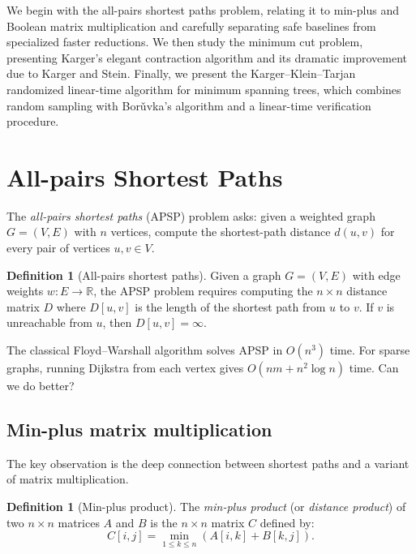 \documentclass[twoside,12pt]{book}
\theoremstyle{plain}
\theoremstyle{definition}
\newtheorem{definition}[theorem]{Definition}
\theoremstyle{remark}
\begin{document}
We begin with the all-pairs shortest paths problem, relating it to min-plus
and Boolean matrix multiplication and carefully separating safe baselines from
specialized faster reductions. We then study the minimum cut problem,
presenting Karger's elegant contraction algorithm and its dramatic improvement
due to Karger and Stein. Finally, we present the Karger--Klein--Tarjan
randomized linear-time algorithm for minimum spanning trees, which combines
random sampling with Bor\v{u}vka's algorithm and a linear-time verification
procedure.

\section{All-pairs Shortest Paths}
\label{sec:apsp}

The \emph{all-pairs shortest paths} (APSP) problem asks: given a weighted graph $G = (V, E)$ with $n$ vertices, compute the shortest-path distance $d(u, v)$ for every pair of vertices $u, v \in V$.

\begin{definition}[All-pairs shortest paths]
Given a graph $G = (V, E)$ with edge weights $w: E \to \mathbb{R}$, the APSP problem requires computing the $n \times n$ distance matrix $D$ where $D[u, v]$ is the length of the shortest path from $u$ to $v$. If $v$ is unreachable from $u$, then $D[u, v] = \infty$.
\end{definition}

The classical Floyd--Warshall algorithm solves APSP in $O(n^3)$ time. For sparse graphs, running Dijkstra from each vertex gives $O(nm + n^2 \log n)$ time. Can we do better?

\subsection{Min-plus matrix multiplication}

The key observation is the deep connection between shortest paths and a variant of matrix multiplication.

\begin{definition}[Min-plus product]
The \emph{min-plus product} (or \emph{distance product}) of two $n \times n$ matrices $A$ and $B$ is the $n \times n$ matrix $C$ defined by:
\[
C[i, j] = \min_{1 \leq k \leq n} \left( A[i, k] + B[k, j] \right).
\]
\end{definition}
\end{document}
